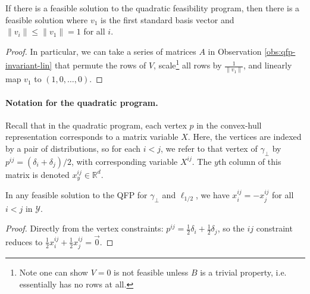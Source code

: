 \documentclass[final]{colt2020} %
\newcommand{\Comments}{1}
\newcommand{\mynote}[2]{\ifnum\Comments=1\textcolor{#1}{#2}\fi}
\newcommand{\jessie}[1]{\mynote{purple}{[JF: #1]}}
\newcommand{\reals}{\mathbb{R}}
\newcommand{\Y}{\mathcal{Y}}
\newcommand{\ellabs}[1]{\ell_{#1}}
\newcommand{\inprod}[2]{\langle #1, #2 \rangle}%
\begin{document}
\begin{corollary} \label{cor:qfp-wlog-v1}
	If there is a feasible solution to the quadratic feasibility program, then there is a feasible solution where $v_1$ is the first standard basis vector and $\|v_i\| \leq \|v_1\| = 1$ for all $i$.
\end{corollary}
\begin{proof}
	In particular, we can take a series of matrices $A$ in Observation \ref{obs:qfp-invariant-lin} that permute the rows of $V$, scale\footnote{Note one can show $V = 0$ is not feasible unless $B$ is a trivial property, i.e. essentially has no rows at all.} all rows by $\frac{1}{\|v_1\|}$, and linearly map $v_1$ to $(1,0,\dots,0)$.
\end{proof}

\paragraph{Notation for the quadratic program.}
Recall that in the quadratic program, each vertex $p$ in the convex-hull representation corresponds to a matrix variable $X$.
Here, the vertices are indexed by a pair of distributions, so for each $i < j$, we refer to that vertex of $\gamma_{\bot}$ by $p^{ij} = (\delta_i + \delta_j)/2$, with corresponding variable $X^{ij}$.
The $y$th column of this matrix is denoted $x^{ij}_y \in \reals^d$.

\begin{lemma} \label{lemma:xiji-minus-xijj}
	In any feasible solution to the QFP for $\gamma_{\bot}$ and $\ell_{1/2}$, we have $x^{ij}_i = -x^{ij}_j$ for all $i<j$ in $\Y$.
\end{lemma}
\begin{proof}
	Directly from the vertex constraints: $p^{ij} = \frac{1}{2}\delta_i + \frac{1}{2}\delta_j$, so the $ij$ constraint reduces to $\frac{1}{2}x^{ij}_i + \frac{1}{2}x^{ij}_j = \vec 0$.
\end{proof}
\end{document}
